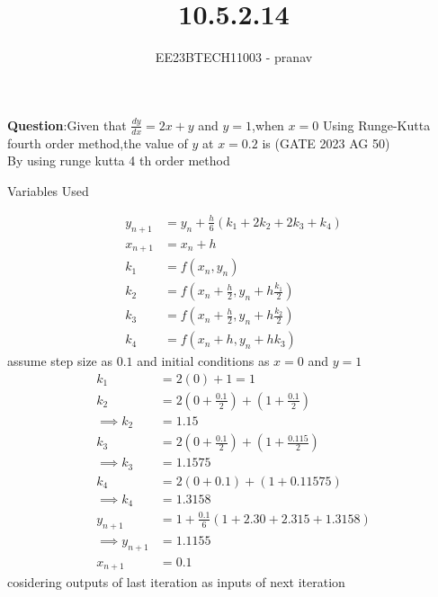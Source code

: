 \documentclass[journal,12pt,twocolumn]{IEEEtran}
\theoremstyle{remark}
\begin{document}

\vspace{3cm}

\title{10.5.2.14}
\author{EE23BTECH11003 - pranav}
\maketitle
\newpage

\bigskip
\renewcommand{\thefigure}{\arabic{figure}}
\renewcommand{\thetable}{\arabic{table}}

\textbf{Question}:Given that $\frac{dy}{dx}=2x+y$ and $y=1$,when $x=0$ Using Runge-Kutta fourth order method,the value of $y$ at $x=0.2$ is \hfill(GATE 2023 AG 50) 
\solution\\
By using runge kutta 4 th order method\\
\begin{table}[h]
    \centering
    
    \caption{Variables Used}
    \label{ag:50}
\end{table}
\begin{align}
    y_{n+1}&= y_{n}+\frac{h}{6}(k_1+2k_2+2k_3+k_4)\\
    x_{n+1}&=x_{n}+h\\
    k_1&=f(x_n,y_n)\\
    k_2&=f(x_n+\frac{h}{2},y_n+h\frac{k_1}{2})\\
    k_3&=f(x_n+\frac{h}{2},y_n+h\frac{k_2}{2})\\
    k_4&=f(x_n+h,y_n+hk_3)
\end{align}
assume step size as $0.1$ and initial conditions as $x=0$ and $y=1$\\
\begin{align}
    k_1&=2(0)+1=1\\
    k_2&=2(0+\frac{0.1}{2})+(1+\frac{0.1}{2})\\
    \implies k_2&= 1.15\\
    k_3&=2(0+\frac{0.1}{2})+(1+\frac{0.115}{2})\\
    \implies k_3&=1.1575\\
    k_4&=2(0+0.1)+(1+0.11575)\\
    \implies k_4&=1.3158\\
    y_{n+1}&=1+\frac{0.1}{6}(1+2.30+2.315+1.3158)\\
    \implies y_{n+1}&=1.1155\\
    x_{n+1}&=0.1
\end{align}
cosidering outputs of last iteration as inputs of next iteration\\
\end{document}

